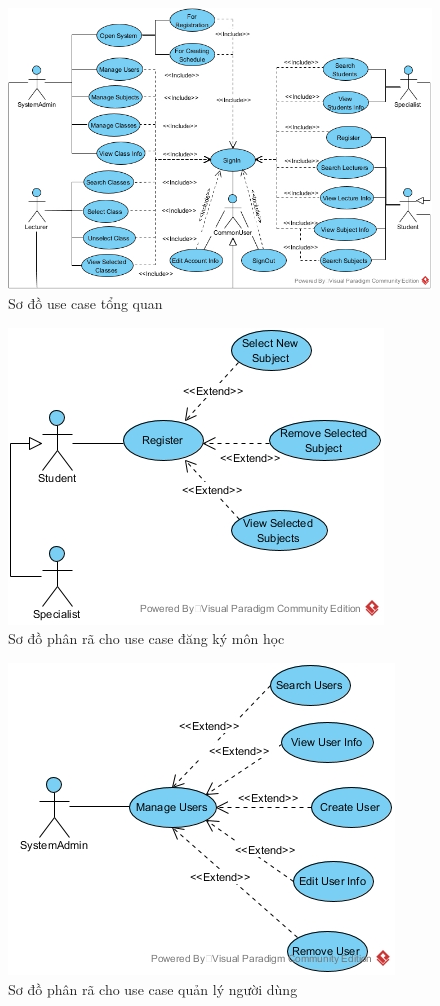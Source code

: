 \documentclass{article}
\begin{document}
  \begin{figure}[!ht]
    \centering
    \includegraphics[scale=0.4]{../pictures/projectdiagrams/uc.jpg}
    \caption{Sơ đồ use case tổng quan}
  \end{figure}

  \begin{figure}[!ht]
    \centering
    \includegraphics[scale=0.7]{../pictures/projectdiagrams/Register-uc-desctructing.jpg}
    \caption{Sơ đồ phân rã cho use case đăng ký môn học}
  \end{figure}

  \begin{figure}[!ht]
    \centering
    \includegraphics[scale=0.7]{../pictures/projectdiagrams/Manage-Users-uc-desctructing.jpg}
    \caption{Sơ đồ phân rã cho use case quản lý người dùng}
  \end{figure}
\end{document}
